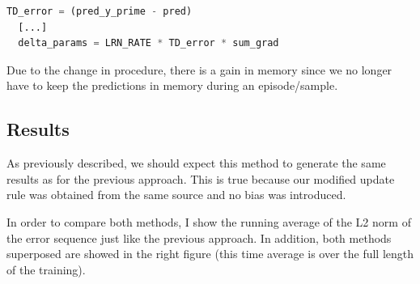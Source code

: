 \documentclass{article}
\begin{document}
\begin{lstlisting}[language=Python]
  TD_error = (pred_y_prime - pred)
  [...]
  delta_params = LRN_RATE * TD_error * sum_grad
\end{lstlisting}

Due to the change in procedure, there is a gain in memory since we no longer have to keep the predictions in memory during an episode/sample.

\subsection{Results}

As previously described, we should expect this method to generate the same results as for the previous approach. This is true because our modified update rule was obtained from the same source and no bias was introduced.

In order to compare both methods, I show the running average of the L2 norm of the error sequence just like the previous approach. In addition, both methods superposed are showed in the right figure (this time average is over the full length of the training).
\end{document}
